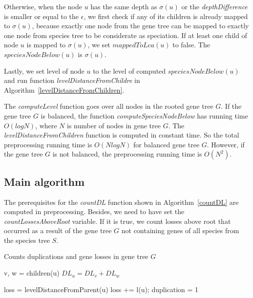 Otherwise, when the node $u$ has the same depth as $\sigma(u)$ or the \emph{depthDifference} is smaller or equal to the $\epsilon$, we first check if any of its children is already mapped to $\sigma(u)$, because exactly one node from the gene tree can be mapped to exactly one node from species tree to be considerate as speciation. If at least one child of node $u$ is mapped to $\sigma(u)$, we set $mappedToLca(u)$ to false. The $speciesNodeBelow(u)$ is $\sigma(u)$.

Lastly, we set level of node $u$ to the level of computed $speciesNodeBelow(u)$ and run function \emph{levelDistanceFromChildre} in Algorithm~\ref{levelDistanceFromChildren}.

The \emph{computeLevel} function goes over all nodes in the rooted gene tree $G$. If the gene tree $G$ is balanced, the function \emph{computeSpeciesNodeBelow} has running time $O(log N)$, where $N$ is number of nodes in gene tree $G$. The \emph{levelDistanceFromChildren} function is computed in constant time. So the total preprocessing running time is $O(N log N)$ for balanced gene tree $G$. However, if the gene tree $G$ is not balanced, the preprocessing running time is $O(N^2)$.

\subsection{Main algorithm} \label{main_algorithm}

The prerequisites for the \emph{countDL} function shown in Algorithm~\ref{countDL} are computed in preprocessing. Besides, we need to have set the \emph{countLossesAboveRoot} variable. If it is true, we count losses above root that occurred as a result of the gene tree $G$ not containing genes of all species from the species tree $S$. 

\begin{algorithm}
\caption{Counts duplications and gene losses in gene tree $G$} 
\label{countDL}
\begin{algorithmic}[1]
		\State v, w = children(u)
		\State $DL_u = DL_v+DL_w$
	\EndIf

	\State loss = levelDistanceFromParent(u)
		\State loss += l(u); 
	\EndIf
		\State duplication = 1
	\EndIf
	
\EndFunction
\end{algorithmic}
\end{algorithm}

